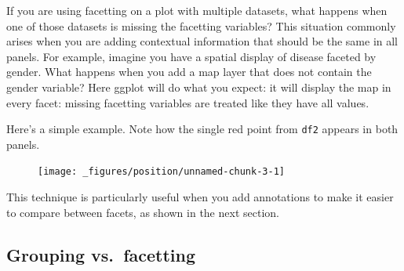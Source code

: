 If you are using facetting on a plot with multiple datasets, what
happens when one of those datasets is missing the facetting variables?
This situation commonly arises when you are adding contextual
information that should be the same in all panels. For example, imagine
you have a spatial display of disease faceted by gender. What happens
when you add a map layer that does not contain the gender variable? Here
ggplot will do what you expect: it will display the map in every facet:
missing facetting variables are treated like they have all values.

Here's a simple example. Note how the single red point from \texttt{df2}
appears in both panels.

\begin{Shaded}
\begin{Highlighting}[]
\StringTok{ }\NormalTok{(} \OperatorTok{:}\NormalTok{, } \OperatorTok{:}\NormalTok{, } \NormalTok{(}\NormalTok{, }\NormalTok{, }\NormalTok{))}
\StringTok{ }\NormalTok{(} \NormalTok{, } \NormalTok{)}

\OperatorTok{+}\StringTok{ }
\StringTok{  }\NormalTok{(} \NormalTok{, } \NormalTok{) }\OperatorTok{+}\StringTok{ }
\StringTok{  }\NormalTok{() }\OperatorTok{+}\StringTok{ }
\StringTok{  }\NormalTok{(}\OperatorTok{~}
\end{Highlighting}
\end{Shaded}

\begin{figure}[H]
  \centering
  \texttt{[image: \_figures/position/unnamed-chunk-3-1]}
\end{figure}

This technique is particularly useful when you add annotations to make
it easier to compare between facets, as shown in the next section.

\hypertarget{sub:group-vs-facet}{%
\subsection{Grouping vs.~facetting}\label{sub:group-vs-facet}}

